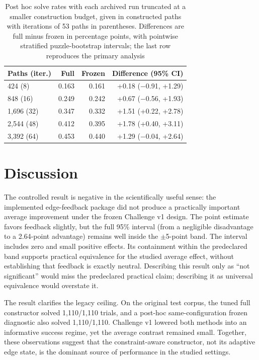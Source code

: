 \documentclass[pdflatex,sn-basic,iicol]{sn-jnl}
\begin{document}
\begin{table}[htbp]
\centering
\setlength{\tabcolsep}{4pt}
\caption{Post hoc solve rates with each archived run truncated at a smaller construction budget, given in constructed paths with iterations of 53 paths in parentheses. Differences are full minus frozen in percentage points, with pointwise stratified puzzle-bootstrap intervals; the last row reproduces the primary analysis}\label{tab-budget}
\begin{tabular}{@{}lrrr@{}}
\toprule
Paths (iter.) & Full & Frozen & Difference (95\% CI) \\
\midrule
424 (8) & 0.163 & 0.161 & +0.18 (\(-\)0.91, +1.29) \\
848 (16) & 0.249 & 0.242 & +0.67 (\(-\)0.56, +1.93) \\
1,696 (32) & 0.347 & 0.332 & +1.51 (+0.22, +2.78) \\
2,544 (48) & 0.412 & 0.395 & +1.78 (+0.40, +3.11) \\
3,392 (64) & 0.453 & 0.440 & +1.29 (\(-\)0.04, +2.64) \\
\bottomrule
\end{tabular}
\end{table}

\section{Discussion}

The controlled result is negative in the scientifically useful sense: the implemented edge-feedback package did not produce a practically important average improvement under the frozen Challenge v1 design. The point estimate favors feedback slightly, but the full 95\% interval (from a negligible disadvantage to a 2.64-point advantage) remains well inside the \(\pm\)5-point band. The interval includes zero and small positive effects. Its containment within the predeclared band supports practical equivalence for the studied average effect, without establishing that feedback is exactly neutral. Describing this result only as ``not significant'' would miss the predeclared practical claim; describing it as universal equivalence would overstate it.

The result clarifies the legacy ceiling. On the original test corpus, the tuned full constructor solved 1,110/1,110 trials, and a post-hoc same-configuration frozen diagnostic also solved 1,110/1,110. Challenge v1 lowered both methods into an informative success regime, yet the average contrast remained small. Together, these observations suggest that the constraint-aware constructor, not its adaptive edge state, is the dominant source of performance in the studied settings.
\end{document}
